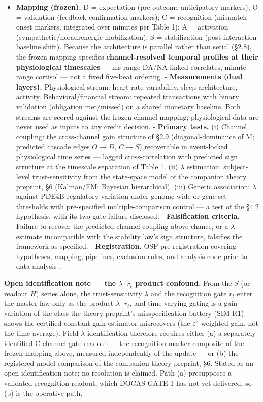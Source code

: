 \documentclass[11pt,twocolumn]{article}
\theoremstyle{plain}
\begin{document}
\begin{itemize}

\item \textbf{Mapping (frozen).} D = expectation (pre-outcome anticipatory markers); O = validation (feedback-confirmation markers); C = recognition (mismatch-onset markers, integrated over minutes per Table 1); A = activation (sympathetic/noradrenergic mobilization); S = stabilization (post-interaction baseline shift). Because the architecture is parallel rather than serial (\S{}2.8), the frozen mapping specifies \textbf{channel-resolved temporal profiles at their physiological timescales} — ms-range DA/NA-linked correlates, minute-range cortisol — not a fixed five-beat ordering.
- \textbf{Measurements (dual layers).} Physiological stream: heart-rate variability, sleep architecture, activity. Behavioral/financial stream: repeated transactions with binary validation (obligation met/missed) on a shared monetary baseline. Both streams are scored against the frozen channel mapping; physiological data are never used as inputs to any credit decision.
- \textbf{Primary tests.} (i) Channel coupling: the cross-channel gain structure of \S{}2.9 (diagonal-dominance of M; predicted cascade edges $O{\to}D$, $C{\to}S$) recoverable in event-locked physiological time series — lagged cross-correlation with predicted sign structure at the timescale separation of Table 1. (ii) $\lambda$ estimation: subject-level trust-sensitivity from the state-space model of the companion theory preprint, \S{}6 (Kalman/EM; Bayesian hierarchical). (iii) Genetic association: $\lambda$ against PDE4B regulatory variation under genome-wide or gene-set thresholds with pre-specified multiple-comparison control — a test of the \S{}4.2 hypothesis, with its two-gate failure disclosed.
- \textbf{Falsification criteria.} Failure to recover the predicted channel coupling above chance, or a $\lambda$ estimate incompatible with the stability law's sign structure, falsifies the framework as specified.
- \textbf{Registration.} OSF pre-registration covering hypotheses, mapping, pipelines, exclusion rules, and analysis code prior to data analysis .

\end{itemize}

\textbf{Open identification note --- the $\lambda \cdot r_t$ product confound.} From the $S$ (or readout $H$) series alone, the trust-sensitivity $\lambda$ and the recognition gate $r_t$ enter the master law only as the product $\lambda \cdot r_t$, and time-varying gating is a gain variation of the class the theory preprint's misspecification battery (SIM-R1) shows the certified constant-gain estimator misrecovers (the $\varepsilon^{2}$-weighted gain, not the time average). Field $\lambda$ identification therefore requires either (a) a separately identified C-channel gate readout --- the recognition-marker composite of the frozen mapping above, measured independently of the update --- or (b) the registered model comparison of the companion theory preprint, \S{}6. Stated as an open identification note; no resolution is claimed. Path (a) presupposes a validated recognition readout, which DOCAS-GATE-1 has not yet delivered, so (b) is the operative path.
\end{document}
